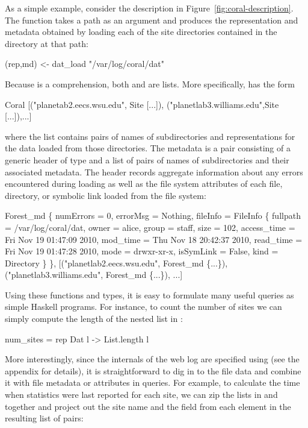 As a simple example, consider the  description in
Figure~\ref{fig:coral-description}. The  function takes
a path as an argument and produces the representation and metadata
obtained by loading each of the site directories contained in the
directory at that path:
%
\begin{code}
(rep,md) <- dat_load "/var/log/coral/dat"
\end{code}
Because  is a comprehension, both  and  are
lists. More specifically,  has the form
\begin{code}
Coral [("planetab2.eecs.wsu.edu", Site [...]),
       ("planetlab3.williams.edu",Site [...]),...]
\end{code}
where the list contains pairs of names of subdirectories and
representations for the data loaded from those directories. The
metadata is a pair consisting of a generic header of type
 and a list of pairs of names of subdirectories and
their associated metadata. The header records aggregate information
about any errors encountered during loading as well as the file system
attributes of each file, directory, or symbolic link loaded from the
file system:
%
\begin{code}
Forest_md 
  \{ numErrors = 0, 
    errorMsg = Nothing, 
    fileInfo = FileInfo
      \{ fullpath = /var/log/coral/dat, 
        owner = alice, group = staff, size = 102, 
        access_time = Fri Nov 19 01:47:09 2010, 
        mod_time = Thu Nov 18 20:42:37 2010, 
        read_time = Fri Nov 19 01:47:28 2010, 
        mode = drwxr-xr-x, isSymLink = False, 
        kind = Directory \} \},
[("planetlab2.eecs.wsu.edu", Forest_md \{...\}),
 ("planetlab3.williams.edu", Forest_md \{...\}), ...]
\end{code}
%
Using these functions and types, it is easy to formulate many useful
queries as simple Haskell programs. For instance, to count the number
of sites we can simply compute the length of the nested list in
:
%
\begin{code}
num_sites =  rep  Dat l -> List.length l 
\end{code}
%
More interestingly, since the internals of the web log are specified
using \padshaskell{} (see \ifanon\auxmaterials{}\else the appendix\fi{}
for details), it is straightforward to dig in to the file data and
combine it with file metadata or attributes in queries.  For example,
to calculate the time when statistics were last reported for each
site, we can zip the lists in  and  together and
project out the site name and the  field from each
element in the resulting list of pairs:
%

